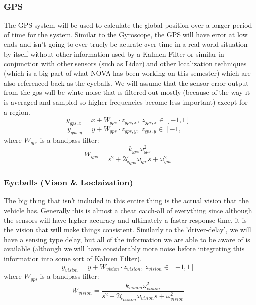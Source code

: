 \documentclass[conference, onecolumn]{IEEEtran}
\begin{document}
\subsubsection{GPS}
The GPS system will be used to calculate the global position over a longer period of time for the system. 
Similar to the Gyroscope, the GPS will have error at low ends and isn't going to ever truely be acurate over-time in a real-world situation by itself without other information used by a Kalmen Filter or similar in conjunction with other sensors (such as Lidar) and other localization techniques (which is a big part of what NOVA has been working on this semester) which are also referenced back as the eyeballs. 
We will assume that the sensor error output from the gps will be white noise that is filtered out mostly (because of the way it is averaged and sampled so higher frequencies become less important) except for a region.
\[
    y_{gps, x} = x  + W_{gps} \cdot z_{gps,x}, \ z_{gps,x} \in [-1,1]    
\]\[
    y_{gps, y} = y  + W_{gps} \cdot z_{gps,y}, \ z_{gps,y} \in [-1,1]    
\] where $W_{gps}$ is a bandpass filter:\[
    W_{gps} = \frac{k_{gps} \omega_{gps}^2}{s^2 + 2 \zeta_{gps} \omega_{gps} s + \omega_{gps}^2}
\]

\subsubsection{Eyeballs (Vison \& Loclaization)}
The big thing that isn't included in this entire thing is the actual vision that the vehicle has. Generally this is almost a cheat catch-all of everything since although the sensors will have higher accuracy and ultimately a faster response time, it is the vision that will make things consistent. 
Similarly to the 'driver-delay', we will have a sensing type delay, but all of the information we are able to be aware of is available (although we will have considerably more noise before integrating this information into some sort of Kalmen Filter).\[
    y_{vision} = y + W_{vision} \cdot z_{vision} , \ z_{vision} \in [-1,1]
\] where $W_{gps}$ is a bandpass filter:\[
    W_{vision} = \frac{k_{vision} \omega_{vision}^2}{s^2 + 2 \zeta_{vision} \omega_{vision} s + \omega_{vision}^2}
\]



% 
% 
\end{document}
